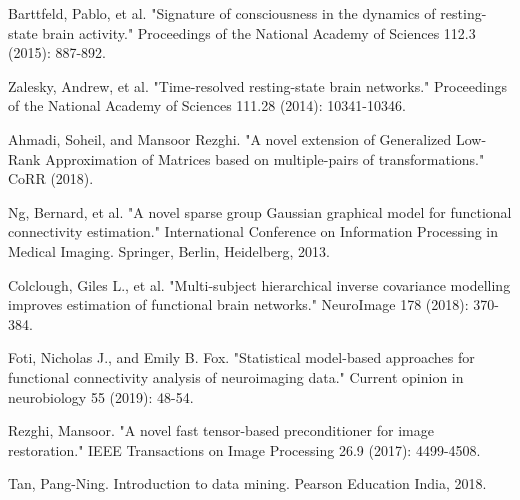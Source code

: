 \documentclass[preprint,12pt]{elsarticle}
\begin{document}
\begin{thebibliography}{1}
		Barttfeld, Pablo, et al. "Signature of consciousness in the dynamics of resting-state brain activity." Proceedings of the National Academy of Sciences 112.3 (2015): 887-892.
		
		Zalesky, Andrew, et al. "Time-resolved resting-state brain networks." Proceedings of the National Academy of Sciences 111.28 (2014): 10341-10346.
		
		Ahmadi, Soheil, and Mansoor Rezghi. "A novel extension of Generalized Low-Rank Approximation of Matrices based on multiple-pairs of transformations." CoRR (2018).
		
		Ng, Bernard, et al. "A novel sparse group Gaussian graphical model for functional connectivity estimation." International Conference on Information Processing in Medical Imaging. Springer, Berlin, Heidelberg, 2013.
		
		Colclough, Giles L., et al. "Multi-subject hierarchical inverse covariance modelling improves estimation of functional brain networks." NeuroImage 178 (2018): 370-384.
		
			Foti, Nicholas J., and Emily B. Fox. "Statistical model-based approaches for functional connectivity analysis of neuroimaging data." Current opinion in neurobiology 55 (2019): 48-54.	
		
		Rezghi, Mansoor. "A novel fast tensor-based preconditioner for image restoration." IEEE Transactions on Image Processing 26.9 (2017): 4499-4508.
		
		
		Tan, Pang-Ning. Introduction to data mining. Pearson Education India, 2018.
		
		
	\end{thebibliography}
	
\end{document}
